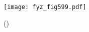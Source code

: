     \begin{figure}[ht!] %
      \centering
      \texttt{[image: fyz\_fig599.pdf]}
      \caption{
               (\cite[s.~707]{Feynman02})}
      \label{fyz:fig599}
    \end{figure}

